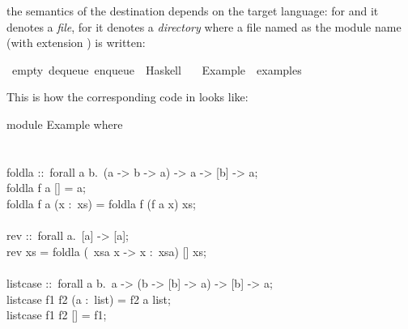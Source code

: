 \begin{isabellebody}
\begin{isamarkuptext}
  the semantics of the destination depends on the target language:  for
   and  it denotes a \emph{file}, for 
  it denotes a \emph{directory} where a file named as the module name
  (with extension ) is written:%
\end{isamarkuptext}%
\isamarkuptrue%
%
\isadelimquote
%
\endisadelimquote
%
\isatagquote
{}\isamarkupfalse%
\ empty\ dequeue\ enqueue\ \ Haskell\isanewline
\ \ \ Example\ \ {\isachardoublequoteopen}examples{\isacharslash}{\isachardoublequoteclose}%
\endisatagquote
{\isafoldquote}%
%
\isadelimquote
%
\endisadelimquote
%
\begin{isamarkuptext}%
\noindent This is how the corresponding code in  looks like:%
\end{isamarkuptext}%
\isamarkuptrue%
%
\isadelimquote
%
\endisadelimquote
%
\isatagquote
%
\begin{isamarkuptext}%
\isatypewriter%
\noindent%
\hspace*{0pt}module Example where {}\\
\hspace*{0pt}\\
\hspace*{0pt}\\
\hspace*{0pt}foldla ::~forall a b.~(a -> b -> a) -> a -> [b] -> a;\\
\hspace*{0pt}foldla f a [] = a;\\
\hspace*{0pt}foldla f a (x :~xs) = foldla f (f a x) xs;\\
\hspace*{0pt}\\
\hspace*{0pt}rev ::~forall a.~[a] -> [a];\\
\hspace*{0pt}rev xs = foldla ({}~xsa x -> x :~xsa) [] xs;\\
\hspace*{0pt}\\
\hspace*{0pt}list{}case ::~forall a b.~a -> (b -> [b] -> a) -> [b] -> a;\\
\hspace*{0pt}list{}case f1 f2 (a :~list) = f2 a list;\\
\hspace*{0pt}list{}case f1 f2 [] = f1;\\

\end{isamarkuptext}
\end{isabellebody}
